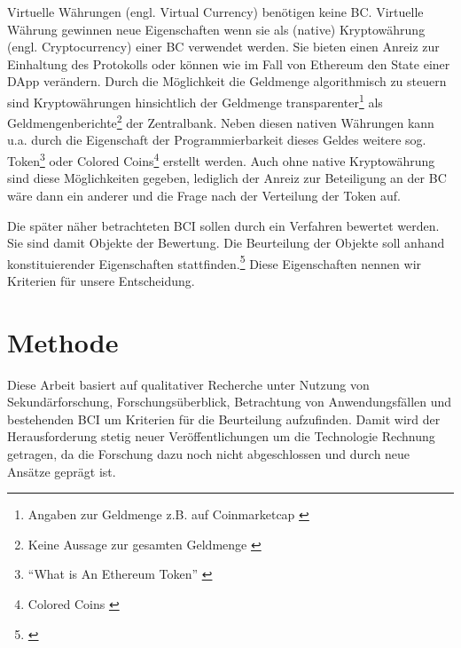 Virtuelle Währungen (engl. Virtual Currency) benötigen keine \gls{BC}.
Virtuelle Währung gewinnen neue Eigenschaften wenn sie als (native) Kryptowährung (engl. Cryptocurrency) einer \gls{BC} verwendet werden.
Sie bieten einen Anreiz zur Einhaltung des Protokolls oder können wie im Fall von Ethereum den State einer \gls{DApp} verändern.
Durch die Möglichkeit die Geldmenge algorithmisch zu steuern sind Kryptowährungen hinsichtlich der Geldmenge transparenter\footnote{Angaben zur Geldmenge z.B. auf Coinmarketcap \autocite{w:cmc}} als Geldmengenberichte\footnote{Keine Aussage zur gesamten Geldmenge \autocite{w:ecb-moneydev}} der Zentralbank.
Neben diesen nativen Währungen kann u.a. durch die Eigenschaft der Programmierbarkeit dieses Geldes weitere sog. Token\footnote{\enquote{What is An Ethereum Token} \autocite{w:eth-token}} oder Colored Coins\footnote{Colored Coins \autocite{b:mastering-bitcoin}%
} erstellt werden.
Auch ohne native Kryptowährung sind diese Möglichkeiten gegeben, lediglich der Anreiz zur Beteiligung an der \gls{BC} wäre dann ein anderer und die Frage nach der Verteilung der Token auf.

Die später näher betrachteten \gls{BCI} sollen durch ein Verfahren bewertet werden.
Sie sind damit Objekte der Bewertung.
Die Beurteilung der Objekte soll anhand konstituierender Eigenschaften stattfinden.\footnote{\cite{b:strassert:entscheidungen}}
Diese Eigenschaften nennen wir Kriterien für unsere Entscheidung.

\section{Methode}

Diese Arbeit basiert auf qualitativer Recherche unter Nutzung von Sekundärforschung, Forschungsüberblick, Betrachtung von Anwendungsfällen und bestehenden \gls{BCI} um Kriterien für die Beurteilung aufzufinden.
Damit wird der Herausforderung stetig neuer Veröffentlichungen um die Technologie Rechnung getragen, da die Forschung dazu noch nicht abgeschlossen und durch neue Ansätze geprägt ist.

